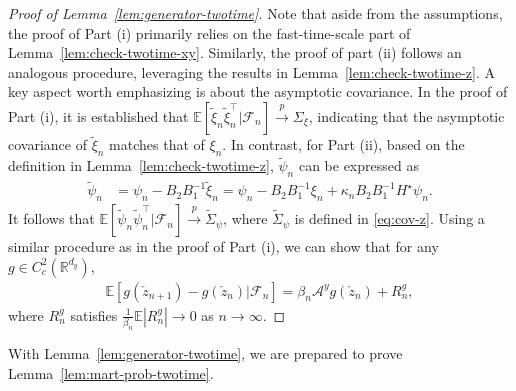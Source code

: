 \documentclass[11pt]{article}
\theoremstyle{plain}
\theoremstyle{definition}
\def\AM{{\mathcal A}}
\def\FM{{\mathcal F}}
\def\RB{{\mathbb R}}
\def\EB{{\mathbb E}}
\newcommand{\zcheck}{{\check{z}}}
\begin{document}
\begin{appendix}
\begin{proof}[Proof of Lemma~\ref{lem:generator-twotime}]
    Note that aside from the assumptions, the proof of Part (i) primarily relies on the fast-time-scale part of Lemma~\ref{lem:check-twotime-xy}. Similarly, the proof of part (ii) follows an analogous procedure, leveraging the results in Lemma~\ref{lem:check-twotime-z}. A key aspect worth emphasizing is about the asymptotic covariance. In the proof of Part (i), it is established that
    $\EB [ \tilde{\xi}_{n} \tilde{\xi}_{n}^\top | \FM_{n} ] \overset{p}{\to} \Sigma_\xi $,
    indicating that the asymptotic covariance of $\tilde{\xi}_{n}$ matches that of $\xi_{n}$.
    In contrast, for Part (ii), based on the definition in Lemma~\ref{lem:check-twotime-z}, $\tilde{\psi}_{n}$ can be expressed as
    \begin{align*}
        \tilde{\psi}_{n} & = \psi_{n} - B_2 B_1^{-1} \tilde{\xi}_{n}
        = \psi_{n} - B_2 B_1^{-1} \xi_{n} + \kappa_{n} B_2 B_1^{-1} H^\star \psi_{n}.
    \end{align*}
    It follows that $\EB [ \tilde{\psi}_{n} \tilde{\psi}_{n}^\top | \FM_{n} ] \overset{p}{\to} \widetilde{\Sigma}_\psi$, where $\widetilde{\Sigma}_{\psi}$ is defined in \eqref{eq:cov-z}.
    Using a similar procedure as in the proof of Part (i), we can show that for any $g \in C^2_c(\RB^{d_y})$,
    \begin{align*}
        \EB [ g (\zcheck_{n+1}) - g(\zcheck_{n}) | \FM_{n} ]
        = \beta_{n} \AM^y g(\zcheck_{n})
        + R^g_{n},
    \end{align*}
    where $R^g_{n}$ satisfies  $\frac{1}{\beta_{n}} \EB | R^g_{n} | \to 0$ as $n \to \infty$.
\end{proof}

With Lemma~\ref{lem:generator-twotime}, we are prepared to prove Lemma~\ref{lem:mart-prob-twotime}.


\end{appendix}
\end{document}
